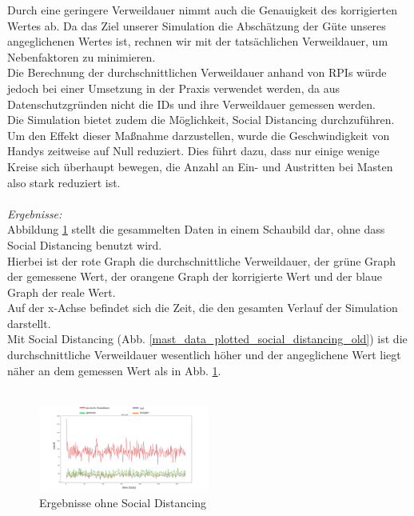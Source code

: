 \documentclass[conference,compsoc]{IEEEtran}
\begin{document}
Durch eine geringere Verweildauer nimmt auch die Genauigkeit des korrigierten Wertes ab. Da das Ziel unserer Simulation die Abschätzung der Güte unseres angeglichenen Wertes ist, rechnen wir mit der tatsächlichen Verweildauer, um Nebenfaktoren zu minimieren.\\ 
Die Berechnung der durchschnittlichen Verweildauer anhand von RPIs würde jedoch bei einer Umsetzung in der Praxis verwendet werden, da aus Datenschutzgründen nicht die IDs und ihre Verweildauer gemessen werden.\\
Die Simulation bietet zudem die Möglichkeit, Social Distancing durchzuführen. Um den Effekt dieser Maßnahme darzustellen, wurde die Geschwindigkeit von Handys zeitweise auf Null reduziert. Dies führt dazu, dass nur einige wenige Kreise sich überhaupt bewegen, die Anzahl an Ein- und Austritten bei Masten also stark reduziert ist.\\ \\
\textit{Ergebnisse:}\\
Abbildung \ref{mast_data_plotted_old} stellt die gesammelten Daten in einem Schaubild dar, ohne dass Social Distancing benutzt wird.\\
Hierbei ist der rote Graph die durchschnittliche Verweildauer, der grüne Graph der gemessene Wert, der orangene Graph der korrigierte Wert und der blaue Graph der reale Wert.\\
Auf der x-Achse befindet sich die Zeit, die den gesamten Verlauf der Simulation darstellt.\\
Mit Social Distancing (Abb. \ref{mast_data_plotted_social_distancing_old}) ist die durchschnittliche Verweildauer wesentlich höher und der angeglichene Wert liegt näher an dem gemessen Wert als in Abb. \ref{mast_data_plotted_old}. \\ \\
\begin{figure}[h]
	\centering
	\includegraphics[width=0.5\textwidth]{"Mast_Data_Plotted_old"}
	\caption{Ergebnisse ohne Social Distancing}
	\label{mast_data_plotted_old}
\end{figure}
\end{document}
